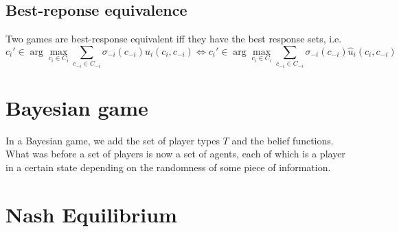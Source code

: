 \documentclass[12pt, openany]{report}
\theoremstyle{definition}
\begin{document}
\subsection{Best-reponse equivalence}
Two games are best-response equivalent iff they have the best response sets, i.e.
\begin{equation}
	c_i'\in \arg\max_{c_i\in C_i} \sum_{c_{-i}\in C_{-i}} \sigma_{-i}(c_{-i})u_i(c_i,c_{-i}) \iff c_i'\in \arg\max_{c_i\in C_i} \sum_{c_{-i}\in C_{-i}} \sigma_{-i}(c_{-i})\hat u_i(c_i,c_{-i})
\end{equation}
\section{Bayesian game}
In a Bayesian game, we add the set of player types $T$ and the belief functions. What was before a set of players is now a set of agents, each of which is a player in a certain state depending on the randomness of some piece of information.
\section{Nash Equilibrium}
\end{document}

